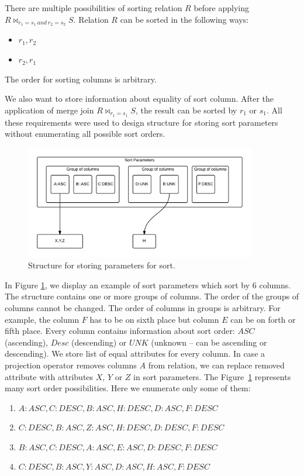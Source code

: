 There are multiple possibilities of sorting relation $R$ before applying \\$R \Join_{r_1=s_1~and~r_2=s_2}S$. Relation $R$ can be sorted in the following ways:
\begin{itemize}
\item $r_1,r_2$
\item $r_2,r_1$
\end{itemize}
The order for sorting columns is arbitrary.

We also want to store information about equality of sort column. After the application of merge join $R\Join_{r_1=s_1} S$, the result can be sorted by $r_1$ or $s_1$. All these requirements were used to design structure for storing sort parameters without enumerating all possible sort orders.

\begin{figure}[h!]
  \centering
    \includegraphics[width=0.9\textwidth]{sortparameters}

      \caption{Structure for storing parameters for sort.}
          \label{fig:sortparameters}
\end{figure}

In Figure \ref{fig:sortparameters}, we display an example of sort parameters which sort by 6 columns. The structure contains one or more groups of columns. The order of the groups of columns cannot be changed. The order of columns in groups is arbitrary. For example, the column $F$ has to be on sixth place but column $E$ can be on forth or fifth place. Every column contains information about sort order: $ASC$ (ascending), $Desc$ (descending) or $UNK$ (unknown -- can be ascending or descending). We store list of equal attributes for every column. In case a projection operator removes columns $A$ from relation, we can replace removed attribute with attributes $X$, $Y$ or $Z$ in sort parameters.
The Figure~\ref{fig:sortparameters} represents many sort order possibilities. Here we enumerate only some of them:
\begin{enumerate}
\item $A:ASC,C:DESC,B:ASC,H:DESC,D:ASC,F:DESC$
\item $C:DESC,B:ASC,Z:ASC,H:DESC,D:DESC,F:DESC$
\item $B:ASC,C:DESC,A:ASC,E:ASC,D:DESC,F:DESC$
\item $C:DESC,B:ASC,Y:ASC,D:ASC,H:ASC,F:DESC$
\end{enumerate}



